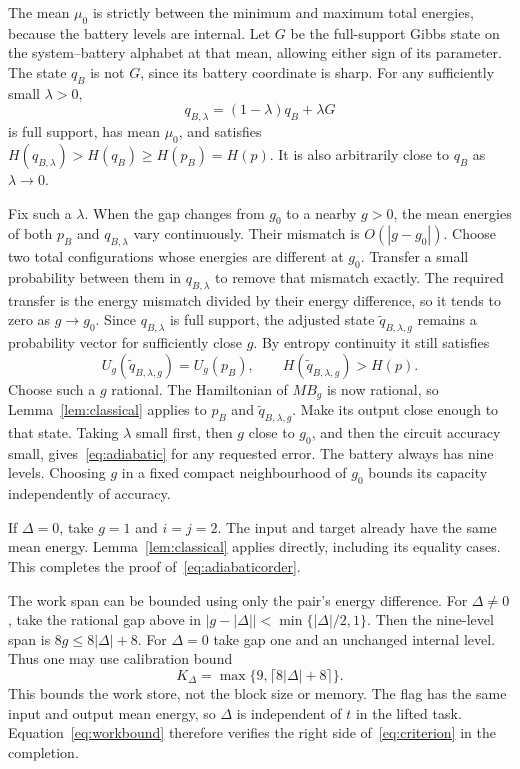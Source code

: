 The mean $\mu_0$ is strictly between the minimum and maximum total energies, because the battery levels are internal. Let $G$ be the full-support Gibbs state on the system--battery alphabet at that mean, allowing either sign of its parameter. The state $q_B$ is not $G$, since its battery coordinate is sharp. For any sufficiently small $\lambda>0$,
\[
 q_{B,\lambda}=(1-\lambda)q_B+\lambda G
\]
is full support, has mean $\mu_0$, and satisfies $H(q_{B,\lambda})>H(q_B)\ge H(p_B)=H(p)$. It is also arbitrarily close to $q_B$ as $\lambda\to0$.

Fix such a $\lambda$. When the gap changes from $g_0$ to a nearby $g>0$, the mean energies of both $p_B$ and $q_{B,\lambda}$ vary continuously. Their mismatch is $O(|g-g_0|)$. Choose two total configurations whose energies are different at $g_0$. Transfer a small probability between them in $q_{B,\lambda}$ to remove that mismatch exactly. The required transfer is the energy mismatch divided by their energy difference, so it tends to zero as $g\to g_0$. Since $q_{B,\lambda}$ is full support, the adjusted state $\widetilde q_{B,\lambda,g}$ remains a probability vector for sufficiently close $g$. By entropy continuity it still satisfies
\[
 U_g(\widetilde q_{B,\lambda,g})=U_g(p_B),\qquad H(\widetilde q_{B,\lambda,g})>H(p).
\]
Choose such a $g$ rational. The Hamiltonian of $MB_g$ is now rational, so Lemma~\ref{lem:classical} applies to $p_B$ and $\widetilde q_{B,\lambda,g}$. Make its output close enough to that state. Taking $\lambda$ small first, then $g$ close to $g_0$, and then the circuit accuracy small, gives~\eqref{eq:adiabatic} for any requested error. The battery always has nine levels. Choosing $g$ in a fixed compact neighbourhood of $g_0$ bounds its capacity independently of accuracy.

If $\Delta=0$, take $g=1$ and $i=j=2$. The input and target already have the same mean energy. Lemma~\ref{lem:classical} applies directly, including its equality cases. This completes the proof of~\eqref{eq:adiabaticorder}.

The work span can be bounded using only the pair's energy difference. For $\Delta\ne0$, take the rational gap above in $|g-|\Delta||<\min\{|\Delta|/2,1\}$. Then the nine-level span is $8g\le8|\Delta|+8$. For $\Delta=0$ take gap one and an unchanged internal level. Thus one may use calibration bound
\begin{equation}
 K_\Delta=\max\{9,\lceil8|\Delta|+8\rceil\}. \label{eq:workbound}
\end{equation}
This bounds the work store, not the block size or memory. The flag has the same input and output mean energy, so $\Delta$ is independent of $t$ in the lifted task. Equation~\eqref{eq:workbound} therefore verifies the right side of~\eqref{eq:criterion} in the completion.
